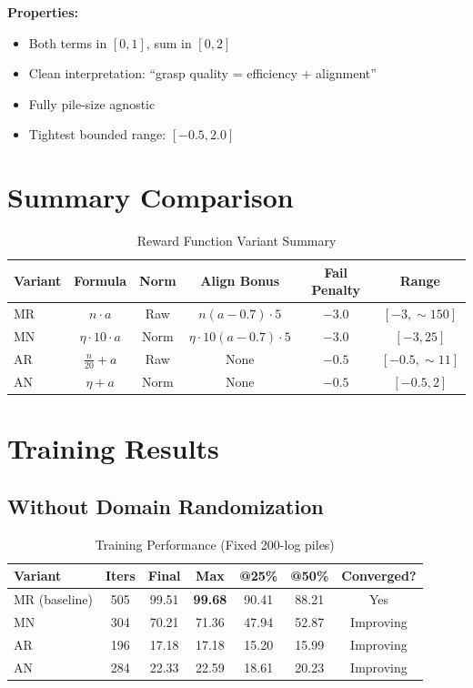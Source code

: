 \documentclass[11pt]{article}
\begin{document}
\textbf{Properties:}
\begin{itemize}
    \item Both terms in $[0, 1]$, sum in $[0, 2]$
    \item Clean interpretation: ``grasp quality = efficiency + alignment''
    \item Fully pile-size agnostic
    \item Tightest bounded range: $[-0.5, 2.0]$
\end{itemize}

\section{Summary Comparison}

\begin{table}[h]
\centering
\caption{Reward Function Variant Summary}
\begin{tabular}{lccccc}
\toprule
\textbf{Variant} & \textbf{Formula} & \textbf{Norm} & \textbf{Align Bonus} & \textbf{Fail Penalty} & \textbf{Range} \\
\midrule
\rowcolor{lightgray} MR & $n \cdot a$ & Raw & $n(a{-}0.7) \cdot 5$ & $-3.0$ & $[-3, {\sim}150]$ \\
MN & $\eta \cdot 10 \cdot a$ & Norm & $\eta \cdot 10(a{-}0.7) \cdot 5$ & $-3.0$ & $[-3, 25]$ \\
\rowcolor{lightgray} AR & $\frac{n}{20} + a$ & Raw & None & $-0.5$ & $[-0.5, {\sim}11]$ \\
AN & $\eta + a$ & Norm & None & $-0.5$ & $[-0.5, 2]$ \\
\bottomrule
\end{tabular}
\end{table}

\section{Training Results}

\subsection{Without Domain Randomization}

\begin{table}[h]
\centering
\caption{Training Performance (Fixed 200-log piles)}
\begin{tabular}{lcccccc}
\toprule
\textbf{Variant} & \textbf{Iters} & \textbf{Final} & \textbf{Max} & \textbf{@25\%} & \textbf{@50\%} & \textbf{Converged?} \\
\midrule
\rowcolor{highlight} MR (baseline) & 505 & 99.51 & \textbf{99.68} & 90.41 & 88.21 & Yes \\
MN & 304 & 70.21 & 71.36 & 47.94 & 52.87 & Improving \\
AR & 196 & 17.18 & 17.18 & 15.20 & 15.99 & Improving \\
AN & 284 & 22.33 & 22.59 & 18.61 & 20.23 & Improving \\
\bottomrule
\end{tabular}
\label{tab:no_dr}
\end{table}
\end{document}
